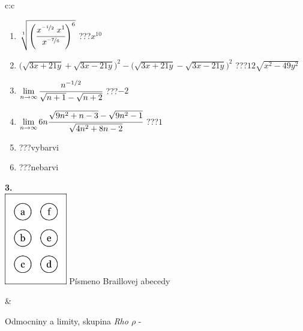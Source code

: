 \documentclass[10pt]{report}
\begin{document}
\begin{tabular}{c:c}
\begin{minipage}[c][104.5mm][t]{0.5\linewidth}
\begin{center}
\begin{minipage}{0.79\linewidth}
\begin{center}
\begin{varwidth}{\linewidth}
\begin{enumerate}
\small
\item $\sqrt[1]{\left(\cfrac{x^{\nicefrac{-1}{2}}\;x^{1}}{x^{\nicefrac{-7}{6}}}\right)^{6}}$\quad \dotfill\; ???\;\dotfill \quad $x^{10}$
\item {\footnotesize{\scriptsize$\big(\sqrt{3x+21y}+\sqrt{3x-21y}\big)^2-\big(\sqrt{3x+21y}-\sqrt{3x-21y}\big)^2$}\quad \dotfill\; ???\;\dotfill \quad $12\sqrt{x^2-49y^2}$}
\item $\lim\limits_{n\to\infty}\cfrac{n^{-1/2}}{\sqrt{n+1}-\sqrt{n+2}}$\quad \dotfill\; ???\;\dotfill \quad $-2$
\item $\lim\limits_{n\to\infty}6n\cfrac{\sqrt{9n^2+n-3}-\sqrt{9n^2-1}}{\sqrt{4n^2+8n-2}}$\quad \dotfill\; ???\;\dotfill \quad $1$
\item \quad \dotfill\; ???\;\dotfill \quad vybarvi
\item \quad \dotfill\; ???\;\dotfill \quad nebarvi
\end{enumerate}
\end{varwidth}
\end{center}
\end{minipage}
\begin{minipage}{0.20\linewidth}
\begin{center}
{\Huge\bfseries 3.} \\[2mm]
\includegraphics[height=40mm]{../images/braille.png}
{\small Písmeno Braillovej abecedy}
\end{center}
\end{minipage}
\end{center}
\end{minipage}
&
\begin{minipage}[c][104.5mm][t]{0.5\linewidth}
\begin{center}
\vspace{7mm}
{\huge Odmocniny a limity, skupina \textit{Rho $\rho$} -}\\[5mm]

\end{center}
\end{minipage}
\end{tabular}
\end{document}
